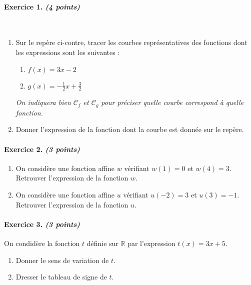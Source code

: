 \documentclass[11pt]{article}
\begin{document}
\paragraph{Exercice 1. \emph{(4 points)}}~\\
\begin{minipage}[]{.3\textwidth}
  \begin{enumerate}
    \item Sur le repère ci-contre, tracer les courbes représentatives des
      fonctions dont les expressions sont les suivantes :
      \begin{enumerate}
        \item $f(x) = 3x-2$
        \item $g(x) = -\frac{1}{2}x+\frac{3}{2}$
      \end{enumerate}
      \emph{On indiquera bien $\mathcal C_f$ et $\mathcal C_g$ pour préciser
      quelle courbe correspond à quelle fonction.}
    \item Donner l'expression de la fonction dont la courbe est donnée sur le
      repère.
  \end{enumerate}
\end{minipage}
\begin{minipage}[]{.7\textwidth}
\begin{center}
\end{center}
\end{minipage}

\paragraph{Exercice 2. \emph{(3 points)}}
\begin{enumerate}
  \item On considère une fonction affine $w$ vérifiant $w(1)=0$ et $w(4)=3$.
    Retrouver l'expression de la fonction $w$.
  \item On considère une fonction affine $u$ vérifiant $u(-2)=3$ et $u(3)=-1$.
    Retrouver l'expression de la fonction $u$.
\end{enumerate}
\paragraph{Exercice 3. \emph{(3 points)}} On condidère la fonction $t$ définie
sur $\mathbb{R}$ par l'expression $t(x) = 3x + 5$.
\begin{enumerate}
  \item Donner le sens de variation de $t$.
  \item Dresser le tableau de signe de $t$.
\end{enumerate}
\end{document}
